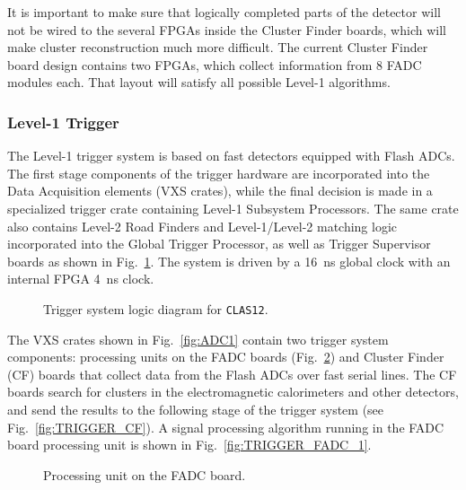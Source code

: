 It is important to make sure that logically completed parts of the detector 
will not be wired to the several FPGAs inside the Cluster Finder boards, which 
will make cluster reconstruction much more difficult.  The current Cluster
Finder board design contains two FPGAs, which collect information from 8 FADC 
modules each.  That layout will satisfy all possible Level-1 algorithms.

\subsubsection{Level-1 Trigger}
\label{l1trig}

The Level-1 trigger system is based on fast detectors equipped with Flash
ADCs.  The first stage components of the trigger hardware are incorporated 
into the Data Acquisition elements (VXS crates), while the final decision is 
made in a specialized trigger crate containing Level-1 Subsystem
Processors. The same crate also contains Level-2 Road Finders and
Level-1/Level-2 matching logic incorporated into the Global Trigger
Processor, as well as Trigger Supervisor boards as 
shown in Fig.~\ref{fig:TRIGGER1}.  The system is driven by a 16~ns global
clock with an internal FPGA 4~ns clock.

\begin{figure}[ht]
\vspace{145mm}
\caption{\small{Trigger system logic diagram for {\tt CLAS12}.}}
\label{fig:TRIGGER1} 
\end{figure}

The VXS crates shown in Fig.~\ref{fig:ADC1} contain two trigger system
components: processing units on the FADC boards (Fig.~\ref{fig:TRIGGER_FADC})
and Cluster Finder (CF) boards that collect data from the Flash ADCs over fast 
serial lines.  The CF boards search for clusters in the electromagnetic 
calorimeters and other detectors, and send the results to the following 
stage of the trigger system (see Fig.~\ref{fig:TRIGGER_CF}).  A signal 
processing algorithm running in the FADC board processing unit is shown in 
Fig.~\ref{fig:TRIGGER_FADC_1}.

\begin{figure}[ht]
\vspace{12.0cm}
\caption{\small{Processing unit on the FADC board.}}
\label{fig:TRIGGER_FADC} 
\end{figure}

